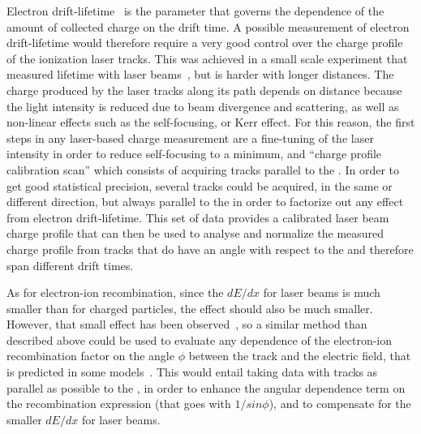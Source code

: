 Electron drift-lifetime~\cite{bib:uBlifetime, Antonello:2014eha} is the parameter that governs the dependence of the amount of collected charge on the drift time. A possible measurement of electron drift-lifetime would therefore require a very good control over the charge profile of the ionization laser tracks. This was achieved in a small scale experiment that measured lifetime with laser beams~\cite{Ereditato:2013xaa}, but is harder with longer distances. The charge produced by the laser tracks along its path depends on distance because the light intensity is reduced due to beam divergence and scattering, as well as non-linear effects such as the self-focusing, or Kerr effect. For this reason, the first steps in any laser-based charge measurement are a fine-tuning of the laser intensity in order to reduce self-focusing to a minimum, and ``charge profile calibration scan'' which consists of acquiring tracks parallel to the . In order to get good statistical precision, several tracks could be acquired, in the same or different direction, but always parallel to the  in order to factorize out any effect from electron drift-lifetime. This set of data provides a calibrated laser beam charge profile that can then be used to analyse and normalize the measured charge profile from tracks that do have an angle with respect to the  and therefore span different drift times.

As for electron-ion recombination, since the $dE/dx$ for laser beams is much smaller than for charged particles, the effect should also be much smaller. However, that small effect has been observed~\cite{Badhrees:2010zz}, so a similar method than described above could be used to evaluate any dependence of the electron-ion recombination factor on the angle $\phi$ between the track and the electric field, that is predicted in some models~\cite{Acciarri:2013met}. This would entail taking data with tracks as parallel as possible to the \efield, in order to enhance the angular dependence term on the recombination expression (that goes with $1/sin \phi$), and to compensate for the smaller $dE/dx$ for laser beams.






